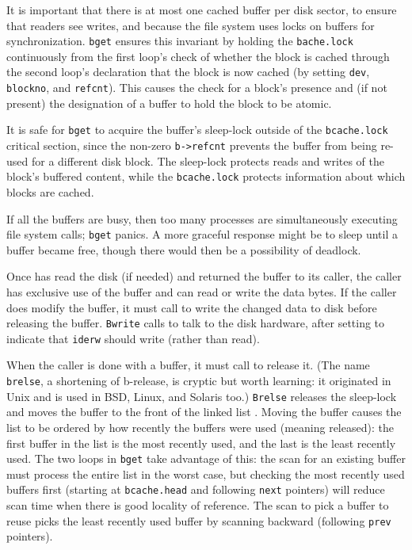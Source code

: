 It is important that there is at most one cached buffer per
disk sector, to ensure that readers see writes, and because the
file system uses locks on buffers for synchronization.
\lstinline{bget}
ensures this invariant by holding the
\lstinline{bache.lock}
continuously from the first loop's check of whether the
block is cached through the second loop's declaration that
the block is now cached (by setting
\lstinline{dev},
\lstinline{blockno},
and
\lstinline{refcnt}).
This causes the check for a block's presence and (if not
present) the designation of a buffer to hold the block to
be atomic.

It is safe for
\lstinline{bget}
to acquire the buffer's sleep-lock outside of the 
\lstinline{bcache.lock}
critical section,
since the non-zero
\lstinline{b->refcnt}
prevents the buffer from being re-used for a different disk block.
The sleep-lock protects reads
and writes of the block's buffered content, while the
\lstinline{bcache.lock}
protects information about which blocks are cached.

If all the buffers are busy, then too many processes are
simultaneously executing file system calls;
\lstinline{bget}
panics.
A more graceful response might be to sleep until a buffer became free,
though there would then be a possibility of deadlock.

Once
has read the disk (if needed) and returned the
buffer to its caller, the caller has
exclusive use of the buffer and can read or write the data bytes.
If the caller does modify the buffer, it must call
to write the changed data to disk before releasing the buffer.
\lstinline{Bwrite}
calls
to talk to the disk hardware, after setting
to indicate that
\lstinline{iderw}
should write (rather than read).

When the caller is done with a buffer,
it must call
to release it. 
(The name
\lstinline{brelse},
a shortening of
b-release,
is cryptic but worth learning:
it originated in Unix and is used in BSD, Linux, and Solaris too.)
\lstinline{Brelse}
releases the sleep-lock and
moves the buffer
to the front of the linked list
.
Moving the buffer causes the
list to be ordered by how recently the buffers were used (meaning released):
the first buffer in the list is the most recently used,
and the last is the least recently used.
The two loops in
\lstinline{bget}
take advantage of this:
the scan for an existing buffer must process the entire list
in the worst case, but checking the most recently used buffers
first (starting at
\lstinline{bcache.head}
and following
\lstinline{next}
pointers) will reduce scan time when there is good locality of reference.
The scan to pick a buffer to reuse picks the least recently used
buffer by scanning backward
(following 
\lstinline{prev}
pointers).
